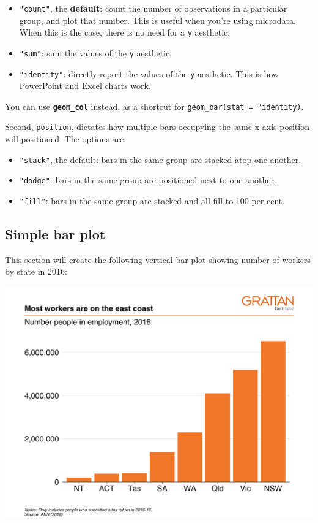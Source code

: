 \documentclass[
]{book}
\providecommand{\tightlist}{%
  \setlength{\itemsep}{0pt}\setlength{\parskip}{0pt}}
\begin{document}
\begin{itemize}
\tightlist
\item
  \texttt{"count"}, the \textbf{default}: count the number of observations in a particular group, and plot that number. This is useful when you're using microdata. When this is the case, there is no need for a \texttt{y} aesthetic.
\item
  \texttt{"sum"}: sum the values of the \texttt{y} aesthetic.
\item
  \texttt{"identity"}: directly report the values of the \texttt{y} aesthetic. This is how PowerPoint and Excel charts work.
\end{itemize}

You can use \textbf{\texttt{geom\_col}} instead, as a shortcut for \texttt{geom\_bar(stat\ =\ "identity)}.

Second, \texttt{position}, dictates how multiple bars occupying the same x-axis position will positioned. The options are:

\begin{itemize}
\tightlist
\item
  \texttt{"stack"}, the default: bars in the same group are stacked atop one another.
\item
  \texttt{"dodge"}: bars in the same group are positioned next to one another.
\item
  \texttt{"fill"}: bars in the same group are stacked and all fill to 100 per cent.
\end{itemize}

\hypertarget{simple-bar-plot}{%
\subsection{Simple bar plot}\label{simple-bar-plot}}

This section will create the following vertical bar plot showing number of workers by state in 2016:

\includegraphics{atlas/simple_bar.png}
\end{document}
